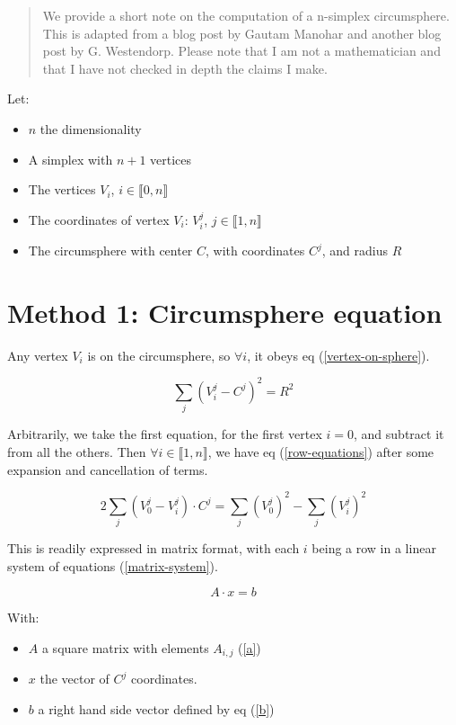 \begin{abstract}
We provide a short note on the computation of a n-simplex circumsphere. This is
adapted from a blog post by Gautam Manohar and another blog post by G.
Westendorp. Please note that I am not a mathematician and that I have not
checked in depth the claims I make.
\end{abstract}

Let:
\begin{itemize}
\item $n$ the dimensionality
\item A simplex with $n+1$ vertices
\item The vertices $V_i$, $i\in \llbracket 0, n \rrbracket$
\item The coordinates of vertex $V_i$: $V_i^j$, $j\in\llbracket 1, n \rrbracket$
\item The circumsphere with center $C$, with coordinates $C^j$, and radius $R$
\end{itemize}

\section{Method 1: Circumsphere equation}
Any vertex $V_i$ is on the circumsphere, so $\forall i$, it obeys eq
(\ref{vertex-on-sphere}).

\begin{equation} \label{vertex-on-sphere}
\sum_j \left( V_i^j - C^j \right)^2 = R^2
\end{equation}

Arbitrarily, we take the first equation, for the first vertex $i=0$, and
subtract it from all the others. Then $\forall i \in \llbracket 1, n
\rrbracket$, we have eq (\ref{row-equations}) after some expansion and
cancellation of terms.

\begin{equation} \label{row-equations}
2 \sum_j \left( V_0^j - V_i^j \right) \cdot C^j =
  \sum_j \left( V_0^j \right)^2 - \sum_j \left( V_i^j \right)^2
\end{equation}

This is readily expressed in matrix format, with each $i$ being a row
in a linear system of equations (\ref{matrix-system}).

\begin{equation} \label{matrix-system}
A \cdot x = b
\end{equation}

With:
\begin{itemize}
\item $A$ a square matrix with elements $A_{i,j}$ (\ref{a})
\item $x$ the vector of $C^j$ coordinates.
\item $b$ a right hand side vector defined by eq (\ref{b})
\end{itemize}

